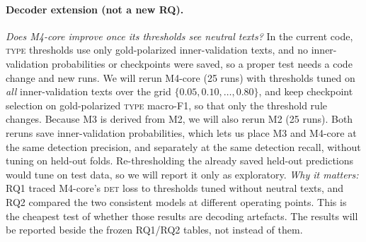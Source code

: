 \documentclass[11pt]{article}
\newcommand{\DET}{\textsc{det}}
\newcommand{\TYPE}{\textsc{type}}
\begin{document}
\paragraph{Decoder extension (not a new RQ).}
\emph{Does M4-core improve once its thresholds see neutral texts?} In the
current code, \TYPE{} thresholds use only gold-polarized inner-validation
texts, and no inner-validation probabilities or checkpoints were saved, so a
proper test needs a code change and new runs. We will rerun M4-core (25 runs) with thresholds tuned on \emph{all}
inner-validation texts over the grid $\{0.05, 0.10, \dots, 0.80\}$, and keep
checkpoint selection on gold-polarized \TYPE{} macro-F1, so that only the
threshold rule changes. Because M3 is derived from M2, we will also rerun M2
(25 runs). Both reruns save inner-validation probabilities, which lets us
place M3 and M4-core at the same detection precision, and separately at the
same detection recall, without tuning on held-out folds. Re-thresholding the
already saved held-out predictions would tune on test data, so we will report
it only as exploratory.
\emph{Why it matters:} RQ1 traced M4-core's \DET{} loss to thresholds tuned
without neutral texts, and RQ2 compared the two consistent models at
different operating points. This is the cheapest test of whether those
results are decoding artefacts. The results will be reported beside the
frozen RQ1/RQ2 tables, not instead of them.
\end{document}
